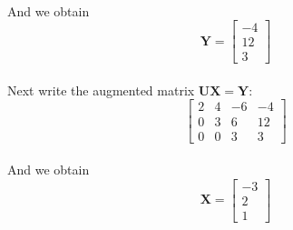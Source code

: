 \documentclass{article}  %
\begin{document}
        \paragraph{}And we obtain
        \begin{equation*}       %
            \bm{Y =} \left[                 %
              \begin{array}{r}   %
                -4 \\
                12 \\
                3
              \end{array}
            \right]                 %
        \end{equation*}
        \paragraph{}Next write the augmented matrix $\bm{UX=Y}$:
        \begin{equation*}       %
            \left[                 %
              \begin{array}{rrr|r}   %
                2 & 4 & -6 & -4\\
                0 & 3 & 6 & 12\\
                0 & 0 & 3 & 3
              \end{array}
            \right]                 %
        \end{equation*}
        \paragraph{}And we obtain
        \begin{equation*}       %
            \bm{X =} \left[                 %
              \begin{array}{r}   %
                -3 \\
                2 \\
                1
              \end{array}
            \right]                 %
        \end{equation*}
\end{document}
